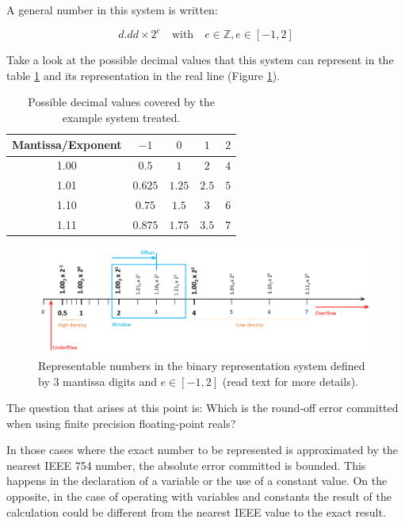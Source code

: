 A general number in this system is written: 

$$
d.dd \times 2^{e}    \quad \textrm{with}\quad e \in \mathbb{Z}, e\in\left[-1, 2\right] 
$$ 

Take a look at the possible decimal values that this system can represent in the table \ref{tab:PossibleValues} and its representation in the real line (Figure \ref{fig:DensityNumbers}). 

\begin{table}
    \centering
    \begin{tabular}{| c | c | c | c | c | }
        \hline
        Mantissa/Exponent   & $-1$ & $0$  & $1$  &   $2$  \\ \hline
        1.00                & $0.5$ & $1$  & $2$  &   $4$  \\ \hline
        1.01                & $0.625$ & $1.25$  & $2.5$  &   $5$  \\ \hline
        1.10                & $0.75$ & $1.5$  & $3$  &   $6$  \\ \hline
        1.11                & $0.875$ & $1.75$  & $3.5$  &   $7$  \\ \hline
    \end{tabular}
    \caption{Possible decimal values covered by the example system treated.}
    \label{tab:PossibleValues}
\end{table}

\begin{figure}[h]
    \centering
    \includegraphics[width= \textwidth]{./doc/Figures/DensityNumbers.png}
    \caption{Representable numbers in the binary representation system defined by 3 mantissa digits and $e\in\left[-1, 2  \right]$ (read text for more details).}
    \label{fig:DensityNumbers}
\end{figure}




The question that arises at this point is: Which is the round-off error committed when using finite precision floating-point reals?

In those cases where the exact number to be represented is approximated by the nearest IEEE 754 number, the absolute error committed is bounded. 
This happens in the declaration of a variable or the use of a constant value. 
On the opposite, in the case of operating with variables and constants the result of the calculation could be different from the nearest IEEE value to the exact result. 




